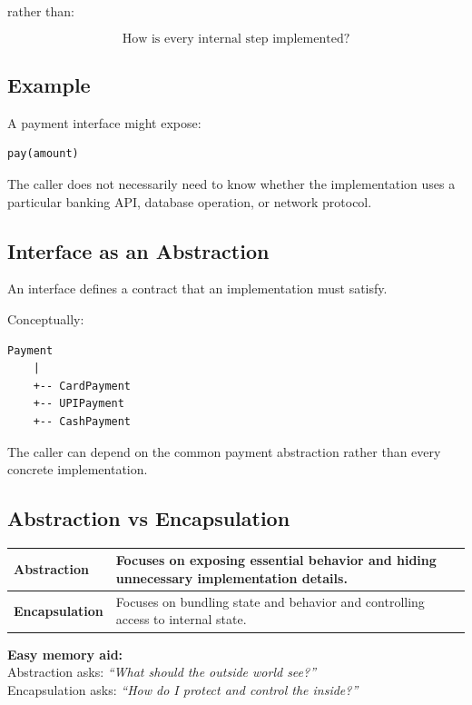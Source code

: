 \documentclass[11pt,a4paper]{article}
\begin{document}
rather than:

\[
\boxed{\text{How is every internal step implemented?}}
\]

\subsection{Example}

A payment interface might expose:

\begin{verbatim}
pay(amount)
\end{verbatim}

The caller does not necessarily need to know whether the implementation uses
a particular banking API, database operation, or network protocol.

\subsection{Interface as an Abstraction}

An interface defines a contract that an implementation must satisfy.

Conceptually:

\begin{verbatim}
Payment
    |
    +-- CardPayment
    +-- UPIPayment
    +-- CashPayment
\end{verbatim}

The caller can depend on the common payment abstraction rather than every
concrete implementation.

\subsection{Abstraction vs Encapsulation}

\begin{tabularx}{\textwidth}{|p{}|X|}
\hline
\textbf{Abstraction} & Focuses on exposing essential behavior and hiding unnecessary implementation details.\\
\hline
\textbf{Encapsulation} & Focuses on bundling state and behavior and controlling access to internal state.\\
\hline
\end{tabularx}

\begin{exambox}
\textbf{Easy memory aid:}\\
Abstraction asks: \textit{``What should the outside world see?''}\\
Encapsulation asks: \textit{``How do I protect and control the inside?''}
\end{exambox}
\end{document}
